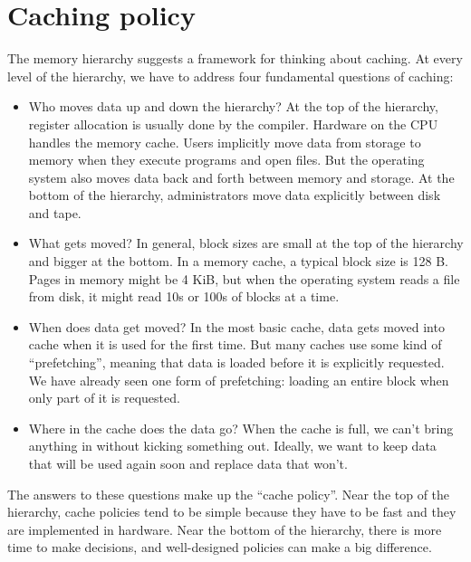 \documentclass[12pt]{book}
\begin{document}
\section{Caching policy}

The memory hierarchy suggests a framework for thinking about
caching.  At every level of the hierarchy, we have to address
four fundamental questions of caching:

\begin{itemize}

\item Who moves data up and down the hierarchy?  At the top of the
  hierarchy, register allocation is usually done by the compiler.
  Hardware on the CPU handles the memory cache.  Users implicitly move
  data from storage to memory when they execute programs and open
  files.  But the operating system also moves data back and forth
  between memory and storage.  At the bottom of the hierarchy,
  administrators move data explicitly between disk and tape.

\item What gets moved?  In general, block sizes are small at the top
  of the hierarchy and bigger at the bottom.  In a memory cache, a
  typical block size is 128 B.  Pages in memory might be 4 KiB, but
  when the operating system reads a file from disk, it might read 10s
  or 100s of blocks at a time.

\item When does data get moved?  In the most basic cache, data gets
  moved into cache when it is used for the first time.  But many
  caches use some kind of ``prefetching'', meaning that data is
  loaded before it is explicitly requested.  We have already seen
  one form of prefetching: loading an entire block when only part of
  it is requested.

\item Where in the cache does the data go?  When the cache is full, we
  can't bring anything in without kicking something out.  Ideally,
  we want to keep data that will be used again soon and replace data
  that won't.

\end{itemize}

The answers to these questions make up the ``cache policy''.
Near the top of the hierarchy, cache policies tend to be simple
because they have to be fast and they are implemented in hardware.
Near the bottom of the hierarchy, there is more time to make decisions,
and well-designed policies can make a big difference.
\end{document}
